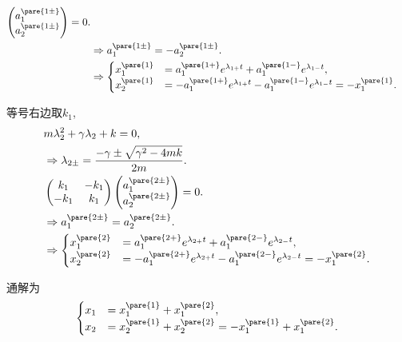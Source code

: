 \documentclass{ctexart}
\begin{document}
\begin{sample}
\begin{ex}
\begin{cenum}
\begin{align*}
\begin{pmatrix}
                    a_1^{\pare{1\pm}} \\ a_2^{\pare{1\pm}}
                \end{pmatrix} = 0. \\
                & \Rightarrow a_1^{\pare{1\pm}} = -a_2^{\pare{1\pm}}. \\
                & \Rightarrow \begin{cases}
                    x_1^{\pare{1}} &= a_1^{\pare{1+}} e^{\lambda_{1+}t} + a_1^{\pare{1-}} e^{\lambda_{1-}t}, \\
                    x_2^{\pare{1}} &= -a_1^{\pare{1+}} e^{\lambda_{1+}t} - a_1^{\pare{1-}} e^{\lambda_{1-}t} = -x_1^{\pare{1}}.
                \end{cases}
            \end{align*}
            \item 等号右边取$k_1$,
            \begin{align*}
                & m\lambda_2^2 + \gamma\lambda_2 + k = 0, \\
                & \Rightarrow \lambda_{2\pm} = \frac{-\gamma \pm \sqrt{\gamma^2 - 4mk}}{2m}. \\
                & \begin{pmatrix}
                    k_1 & -k_1 \\
                    -k_1 & k_1
                \end{pmatrix}\begin{pmatrix}
                    a_1^{\pare{2\pm}} \\ a_2^{\pare{2\pm}}
                \end{pmatrix} = 0. \\
                 & \Rightarrow a_1^{\pare{2\pm}} = a_2^{\pare{2\pm}}. \\
                 & \Rightarrow \begin{cases}
                    x_1^{\pare{2}} &= a_1^{\pare{2+}} e^{\lambda_{2+}t} + a_1^{\pare{2-}} e^{\lambda_{2-}t}, \\
                    x_2^{\pare{2}} &= -a_1^{\pare{2+}} e^{\lambda_{2+}t} - a_1^{\pare{2-}} e^{\lambda_{2-}t} = -x_1^{\pare{2}}.
                \end{cases}
            \end{align*}
        \end{cenum}
        通解为
        \[ \begin{cases}
            x_1 &= x_1^{\pare{1}} + x_1^{\pare{2}}, \\
            x_2 &= x_2^{\pare{1}} + x_2^{\pare{2}} = -x_1^{\pare{1}} + x_1^{\pare{2}}.

\end{cases}\]
\end{ex}
\end{sample}
\end{document}
